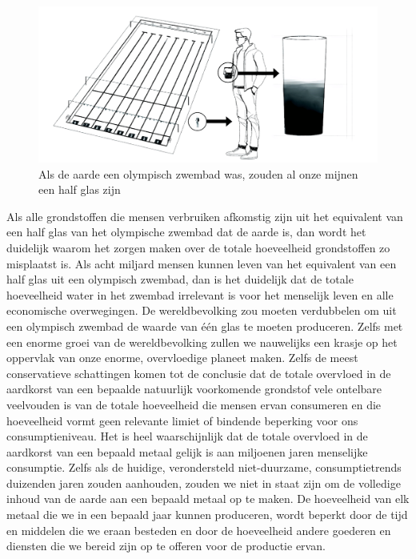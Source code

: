 \begin{figure}[!htb]
\centering
    \includegraphics[width=\textwidth]{figures/fig3-1.png}
\caption[Als de aarde een olympisch zwembad was, zouden al
onze mijnen een half glas zijn]{Als de aarde een olympisch zwembad was, zouden al
onze mijnen een half glas zijn}
\label{fig3}
\end{figure}

Als alle grondstoffen die mensen verbruiken afkomstig zijn uit het
equivalent van een half glas van het olympische zwembad dat de aarde is,
dan wordt het duidelijk waarom het zorgen maken over de totale
hoeveelheid grondstoffen zo misplaatst is. Als acht miljard mensen
kunnen leven van het equivalent van een half glas uit een olympisch
zwembad, dan is het duidelijk dat de totale hoeveelheid water in het
zwembad irrelevant is voor het menselijk leven en alle economische
overwegingen. De wereldbevolking zou moeten verdubbelen om uit een
olympisch zwembad de waarde van één glas te moeten produceren. Zelfs met
een enorme groei van de wereldbevolking zullen we nauwelijks een krasje
op het oppervlak van onze enorme, overvloedige planeet maken. Zelfs de
meest conservatieve schattingen komen tot de conclusie dat de totale
overvloed in de aardkorst van een bepaalde natuurlijk voorkomende
grondstof vele ontelbare veelvouden is van de totale hoeveelheid die
mensen ervan consumeren en die hoeveelheid vormt geen relevante limiet
of bindende beperking voor ons consumptieniveau. Het is heel
waarschijnlijk dat de totale overvloed in de aardkorst van een bepaald
metaal gelijk is aan miljoenen jaren menselijke consumptie. Zelfs als de
huidige, verondersteld niet-duurzame, consumptietrends duizenden jaren
zouden aanhouden, zouden we niet in staat zijn om de volledige inhoud
van de aarde aan een bepaald metaal op te maken. De hoeveelheid van elk metaal die we in een bepaald jaar kunnen produceren, wordt beperkt door de tijd en middelen die we eraan besteden en door de hoeveelheid andere goederen en diensten die we bereid zijn op te offeren voor de productie ervan.

